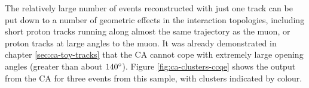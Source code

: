 The relatively large number of events reconstructed with just one track can be put down to a number of geometric effects in the interaction topologies, including short proton tracks running along almost the same trajectory as the muon, or proton tracks at large angles to the muon. It was already demonstrated in chapter \ref{sec:ca-toy-tracks} that the \ac{CA} cannot cope with extremely large opening angles (greater than about $140^\circ$). Figure \ref{fig:ca-clusters-ccqe} shows the output from the CA for three events from this sample, with clusters indicated by colour.

\begin{figure}
    \centering
\end{figure}
